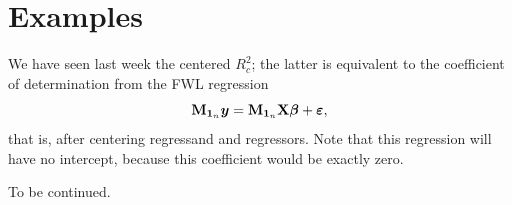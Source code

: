 \documentclass[]{book}
\theoremstyle{definition}
\theoremstyle{definition}
\theoremstyle{definition}
\theoremstyle{remark}
\begin{document}
\section{Examples}\label{examples}

We have seen last week the centered \(R^2_c\); the latter is equivalent
to the coefficient of determination from the FWL regression
\[ \mathbf{M}_{\mathbf{1}_n}\boldsymbol{y} = \mathbf{M}_{\mathbf{1}_n}\mathbf{X} \boldsymbol{\beta} + \boldsymbol{\varepsilon},\]
that is, after centering regressand and regressors. Note that this
regression will have no intercept, because this coefficient would be
exactly zero.

To be continued.


\end{document}
